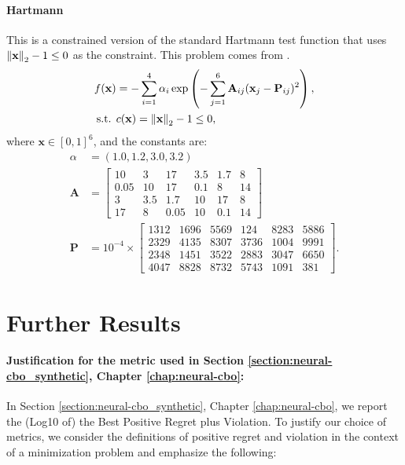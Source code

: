 \paragraph{Hartmann} This is a constrained version of the standard Hartmann test function that uses $\norm{\mathbf{x}}_2 -1 \le 0$  as the constraint. This problem comes from \citet{letham2019constrained}.
\begin{align*}    
f(\mathbf{x}) &= -\sum_{i=1}^{4} \alpha_i \exp \left( -\sum_{j=1}^{6} \mathbf{A}_{ij} (\mathbf{x}_j - \mathbf{P}_{ij})^2 \right),
\\
\text{s.t. } & c(\mathbf{x}) = \norm{\mathbf{x}}_2 -1 \le 0,
\end{align*}
where \( \mathbf{x} \in [0,1]^6 \), and the constants are:
\begin{align*}
   \alpha & = (1.0, 1.2, 3.0, 3.2)
\\
\mathbf{A} &= \begin{bmatrix}
10 & 3 & 17 & 3.5 & 1.7 & 8 \\
0.05 & 10 & 17 & 0.1 & 8 & 14 \\
3 & 3.5 & 1.7 & 10 & 17 & 8 \\
17 & 8 & 0.05 & 10 & 0.1 & 14
\end{bmatrix}\\
\mathbf{P} &= 10^{-4} \times \begin{bmatrix}
1312 & 1696 & 5569 & 124 & 8283 & 5886 \\
2329 & 4135 & 8307 & 3736 & 1004 & 9991 \\
2348 & 1451 & 3522 & 2883 & 3047 & 6650 \\
4047 & 8828 & 8732 & 5743 & 1091 & 381
\end{bmatrix}. 
\end{align*}

\section{Further Results}
\label{section:neural-cbo_further_results}
\paragraph{Justification for the metric used in Section \ref{section:neural-cbo_synthetic}, Chapter \ref{chap:neural-cbo}:}

In Section \ref{section:neural-cbo_synthetic}, Chapter \ref{chap:neural-cbo}, we report the (Log10 of) the Best Positive Regret plus Violation. To justify our choice of metrics, we consider the definitions of positive regret and violation in the context of a minimization problem and emphasize the following:

